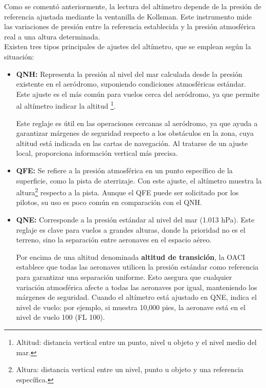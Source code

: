 Como se comentó anteriormente, la lectura del altímetro depende de la presión de referencia ajustada mediante la ventanilla de Kollsman. Este instrumento mide las variaciones de presión entre la referencia establecida y la presión atmosférica real a una altura determinada.\\

Existen tres tipos principales de ajustes del altímetro, que se emplean según la situación:\\
\begin{itemize}
\item \textbf{QNH:} Representa la presión al nivel del mar calculada desde la presión existente en el aeródromo, suponiendo condiciones atmosféricas estándar. Este ajuste es el más común para vuelos cerca del aeródromo, ya que permite al altímetro indicar la altitud \footnote{Altitud: distancia vertical entre un punto, nivel u objeto y el nivel medio del mar.}. 

 Este reglaje es útil en las operaciones cercanas al aeródromo, ya que ayuda a garantizar márgenes de seguridad respecto a los obstáculos en la zona, cuya altitud está indicada en las cartas de navegación. Al tratarse de un ajuste local, proporciona información vertical más precisa. 

\item \textbf{QFE:} Se refiere a la presión atmosférica en un punto específico de la superficie, como la pista de aterrizaje. Con este ajuste, el altímetro muestra la altura\footnote{Altura: distancia vertical entre un nivel, punto u objeto y una referencia específica.} respecto a la pista. Aunque el QFE puede ser solicitado por los pilotos, su uso es poco común en comparación con el QNH.

\item \textbf{QNE:} Corresponde a la presión estándar al nivel del mar (1.013 hPa). Este reglaje es clave para vuelos a grandes alturas, donde la prioridad no es el terreno, sino la separación entre aeronaves en el espacio aéreo.

 Por encima de una altitud denominada \textbf{altitud de transición}, la OACI establece que todas las aeronaves utilicen la presión estándar como referencia para garantizar una separación uniforme. Esto asegura que cualquier variación atmosférica afecte a todas las aeronaves por igual, manteniendo los márgenes de seguridad. Cuando el altímetro está ajustado en QNE, indica el nivel de vuelo: por ejemplo, si muestra 10,000 pies, la aeronave está en el nivel de vuelo 100 (FL 100).\\
\end{itemize}

